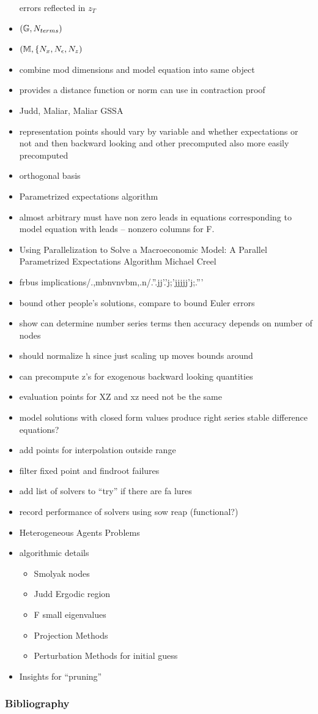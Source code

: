 \documentclass[tikz]{beamer}
\begin{document}
\begin{frame}
\begin{itemize}
errors reflected in $z_T$ 
  \item $({\mathbb{G}},{N_{terms}})$
  \item $(\mathbb{M},\{{N_x},{N_\epsilon},{N_z})$
  \item combine mod dimensions and model equation into same object
  \item provides a distance function or norm can use in contraction proof
  \item Judd, Maliar, Maliar GSSA
  \item representation points should vary by variable and whether expectations or not and then backward looking and other precomputed also more easily precomputed
  \item orthogonal basis
  \item Parametrized expectations algorithm
  \item almost arbitrary must have non zero leads in equations corresponding to model equation with leads -- nonzero columns for F.
  \item Using Parallelization to Solve a Macroeconomic Model: A Parallel Parametrized Expectations Algorithm
Michael Creel
  \item frbus implications/.,mbnvnvbm,.n/.''.jj'.'j;'jjjjj'j;.'''
  \item bound other people's solutions, compare to bound Euler errors
  \item show can determine number series terms then accuracy depends on number of nodes
  \item should normalize h since just scaling up moves bounds around
  \item can precompute z's for exogenous backward looking quantities
  \item evaluation points for XZ and xz need not be the same
  \item model solutions with closed form values produce right series stable difference equations?
  \item add points for interpolation outside range
  \item filter fixed point and findroot failures
  \item add list of solvers to ``try'' if there are fa lures
  \item record performance of solvers using sow reap (functional?)
  \item Heterogeneous Agents Problems
\item algorithmic details
  \begin{itemize}
 \item Smolyak nodes
 \item Judd Ergodic region
 \item F small eigenvalues
 \item Projection Methods
 \item Perturbation Methods for initial guess
  \end{itemize}
\item Insights for ``pruning''
  \end{itemize}
\end{frame}

\begin{frame}
  \frametitle{Bibliography}
  


\end{frame}

\appendix
\end{document}
